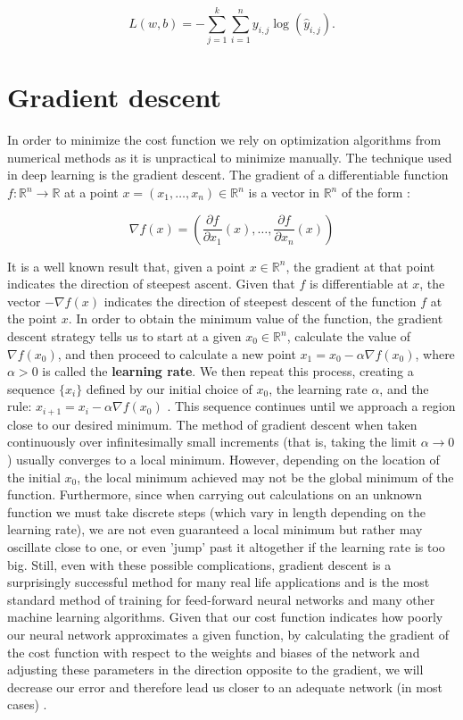 \begin{equation}
  \label{equ:m_likelihood}
  L(w, b) = - \sum_{j = 1}^k \sum_{i = 1}^{n} y_{i, j} \log(\hat{y}_{i, j}).
\end{equation}

\section{Gradient descent}
In order to minimize the cost function we rely on optimization algorithms from numerical methods as it is unpractical to minimize manually. The technique used in deep learning is the gradient descent. The gradient of a differentiable function $f: \mathbb{R}^n \longrightarrow \mathbb{R}$ at a point $x = (x_1, \ldots, x_n) \in \mathbb{R}^n$ is a vector in $\mathbb{R}^n$ of the form \cite{Guil}:

\begin{equation}
  \label{equ:gradient}
  \nabla f(x) = (\frac{\partial f}{\partial x_1} (x), \ldots, \frac{\partial f}{\partial x_n} (x))
\end{equation}

It is a well known result that, given a point $x \in \mathbb{R}^n$, the gradient at that point indicates the direction of steepest ascent. Given that $f$ is differentiable at $x$, the vector $-\nabla f(x)$ indicates the direction of steepest descent of the function $f$ at the point $x$.
In order to obtain the minimum value of the function, the gradient descent strategy tells us to start at a given $x_0 \in \mathbb{R}^n$, calculate the value of $\nabla f(x_0)$, and then proceed to calculate a new point $x_1 = x_0 − \alpha \nabla f(x_0)$, where $\alpha > 0$ is called the \textbf{learning rate}. We then repeat this process, creating a sequence $\{ x_i \}$ defined by our initial choice of $x_0$, the learning rate $\alpha$, and the rule: $x_{i + 1} = x_{i} − \alpha \nabla f(x_0)$  . This sequence continues until we approach a region close to our desired minimum.
The method of gradient descent when taken continuously over infinitesimally small increments (that is, taking the limit $\alpha \rightarrow 0$) usually converges to a local minimum. However, depending on the location of the initial $x_0$, the local minimum achieved may not be the global minimum of the function. Furthermore, since when carrying out calculations on an unknown function we must take discrete steps (which vary in length depending on the learning rate), we are not even guaranteed a local minimum but rather may oscillate close to one, or even ’jump’ past it altogether if the learning rate is too big. Still, even with these possible complications, gradient descent is a surprisingly successful method for many real life applications and is the most standard method of training for feed-forward neural networks and many other machine learning algorithms.
Given that our cost function indicates how poorly our neural network approximates a given function, by calculating the gradient of the cost function with respect to the weights and biases of the network and adjusting these parameters in the direction opposite to the gradient, we will decrease our error and therefore lead us closer to an adequate network (in most cases) \cite{Guil}.

